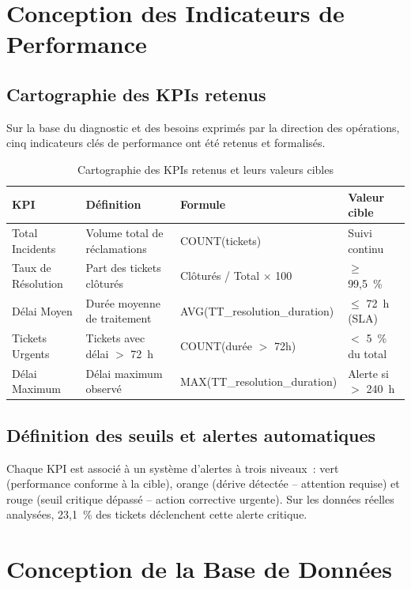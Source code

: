 \documentclass[11pt,a4paper]{report}
\begin{document}
\section{Conception des Indicateurs de Performance}

\subsection{Cartographie des KPIs retenus}

Sur la base du diagnostic et des besoins exprimés par la direction des opérations, cinq indicateurs clés de performance ont été retenus et formalisés.

\begin{table}[h!]
\centering
\caption{Cartographie des KPIs retenus et leurs valeurs cibles}
\begin{tabularx}{\textwidth}{L{3.5cm} L{4cm} L{3cm} L{2.5cm}}
\toprule
\textbf{KPI} & \textbf{Définition} & \textbf{Formule} & \textbf{Valeur cible} \\
\midrule
Total Incidents    & Volume total de réclamations     & COUNT(tickets)                  & Suivi continu \\
Taux de Résolution & Part des tickets clôturés        & Clôturés / Total $\times$ 100   & $\geq$ 99,5~\% \\
Délai Moyen        & Durée moyenne de traitement      & AVG(TT\_resolution\_duration)   & $\leq$ 72~h (SLA) \\
Tickets Urgents    & Tickets avec délai $>$ 72~h      & COUNT(durée $>$ 72h)            & $<$ 5~\% du total \\
Délai Maximum      & Délai maximum observé            & MAX(TT\_resolution\_duration)   & Alerte si $>$ 240~h \\
\bottomrule
\end{tabularx}
\label{tab:kpis}
\end{table}

\subsection{Définition des seuils et alertes automatiques}

Chaque KPI est associé à un système d'alertes à trois niveaux~: vert (performance conforme à la cible), orange (dérive détectée -- attention requise) et rouge (seuil critique dépassé -- action corrective urgente). Sur les données réelles analysées, 23,1~\% des tickets déclenchent cette alerte critique.

\section{Conception de la Base de Données}
\end{document}
